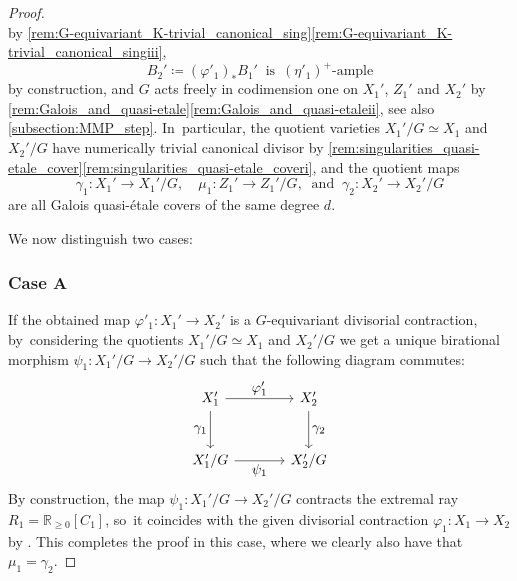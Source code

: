 \documentclass[10pt]{amsart}
\let\ts\textstyle
\theoremstyle{plain}
\theoremstyle{definition}
\newcommand{\R}{\mathbb{R}}
\begin{document}
\begin{proof}
\[\]
by \autoref{rem:G-equivariant_K-trivial_canonical_sing}\eqref{rem:G-equivariant_K-trivial_canonical_singiii},
\begin{equation}
\label{eq:2_lifting_MMP}
B_2'\coloneq (\varphi'_1)_* B_1' \ \text{ is } \,(\eta'_1)^+ \text{-ample}
\end{equation}
by construction, and $G$ acts freely in codimension one on $X_1'$, $Z_1'$ and $X_2'$ by \autoref{rem:Galois_and_quasi-etale}\eqref{rem:Galois_and_quasi-etaleii}, see also \autoref{subsection:MMP_step}. In~particular, the quotient varieties $X_1' / G \simeq X_1$ and $X_2' / G$ have numerically trivial canonical divisor by \autoref{rem:singularities_quasi-etale_cover}\eqref{rem:singularities_quasi-etale_coveri}, and the quotient maps
\[
\gamma_1 \colon X_1' \to X_1' / G, \quad \mu_1 \colon Z_1' \to Z_1' / G, \ \text{ and } \ \gamma_2 \colon X_2' \to X_2' / G
\]
are all Galois quasi-étale covers of the same degree $d$.

We now distinguish two cases:

\subsubsection*{Case A}
If the obtained map $\varphi'_1 \colon X_1' \to X_2'$ is a $G$\nobreakdash-equivariant divisorial contraction, by~considering the quotients $X_1' / G \simeq X_1$ and $X_2' / G$ we get a unique birational morphism $\psi_1 \colon X_1' / G \to X_2' / G$ such that the following diagram commutes:
\[
\begin{tikzcd}[row sep = large, column sep = large]
X_1' \arrow[d, "\ts \gamma_1" swap] \arrow[r, "\ts \varphi'_1"] & X_2' \arrow[d, "\ts \gamma_2"] \\
X_1' / G \arrow[r, "\ts \psi_1" swap] & X_2'/G
\end{tikzcd}
\]
By construction, the map $\psi_1 \colon X_1' / G \to X_2' / G$ contracts the extremal ray $R_1 = \R_{\geq 0}[C_1]$, so~it coincides with the given divisorial contraction $\varphi_1 \colon X_1 \to X_2$ by \cite[Prop.\,1.14(b)]{Debarre01book}.
This completes the proof in this case, where we clearly also have that $\mu_1 = \gamma_2$.


\end{proof}
\end{document}
